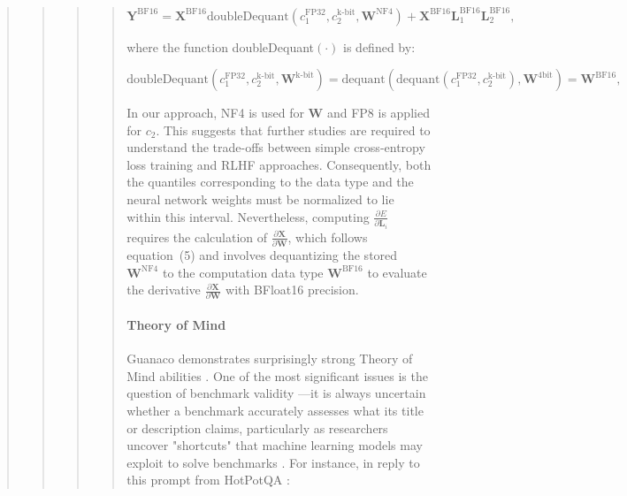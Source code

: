 \begin{quote}
\begin{quote}
\begin{abstract}
{\begin{quote}
{\begin{equation}
    \mathbf{Y}^{\text{BF16}} =  \mathbf{X}^{\text{BF16}} \text{doubleDequant}(c_1^{\text{FP32}}, c_2^{\text{k-bit}}, \mathbf{W}^{\text{NF4}}) + \mathbf{X}^{\text{BF16}}\mathbf{L}^{\text{BF16}}_1\mathbf{L}^{\text{BF16}}_2,
\end{equation}

where the function doubleDequant$(\cdot)$ is defined by:

\begin{equation}
    \text{doubleDequant}(c_1^{\text{FP32}}, c_2^{\text{k-bit}}, \mathbf{W}^{\text{k-bit}}) = \text{dequant}(\text{dequant}(c_1^{\text{FP32}}, c_2^{\text{k-bit}}), \mathbf{W}^{\text{4bit}}) = \mathbf{W}^{\text{BF16}},
\end{equation}

In our approach, NF4 is used for $\mathbf{W}$ and FP8 is applied for $c_2$. This suggests that further studies are required to understand the trade-offs between simple cross-entropy loss training and RLHF approaches. Consequently, both the quantiles corresponding to the data type and the neural network weights must be normalized to lie within this interval. Nevertheless, computing $\frac{\partial E}{\partial \mathbf{L}_i}$ requires the calculation of $\frac{\partial \mathbf{X}}{\partial \mathbf{W}}$, which follows equation~(5) and involves dequantizing the stored $\mathbf{W}^{\text{NF4}}$ to the computation data type $\mathbf{W}^{\text{BF16}}$ to evaluate the derivative $\frac{\partial \mathbf{X}}{\partial \mathbf{W}}$ with BFloat16 precision. \paragraph{Theory of Mind} {Guanaco} demonstrates surprisingly strong Theory of Mind abilities \cite{nematzadeh2018evaluating, sap2022neural}. One of the most significant issues is the question of benchmark validity \citep{liao2021we}—it is always uncertain whether a benchmark accurately assesses what its title or description claims, particularly as researchers uncover "shortcuts" that machine learning models may exploit to solve benchmarks \citep{gururangan2018annotation, poliak2018hypothesis}. For instance, in reply to this prompt from HotPotQA \citep{yang2018hotpotqa}:  

}
\end{quote}}
\end{abstract}
\end{quote}
\end{quote}
